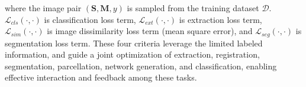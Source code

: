 where the image pair $(\mathbf{S},\mathbf{M},y)$ is sampled from the training dataset $\mathcal{D}$. $\mathcal{L}_{cls}(\cdot, \cdot)$ is classification loss term, $\mathcal{L}_{ext}(\cdot, \cdot)$ is extraction loss term, $\mathcal{L}_{sim}(\cdot, \cdot)$ is image dissimilarity loss term (\eg mean square error), and $\mathcal{L}_{seg}(\cdot, \cdot)$ is segmentation loss term. 
These four criteria leverage the limited labeled information, and guide a joint optimization of extraction, registration, segmentation, parcellation, network generation, and classification, enabling effective interaction and feedback among these tasks.



